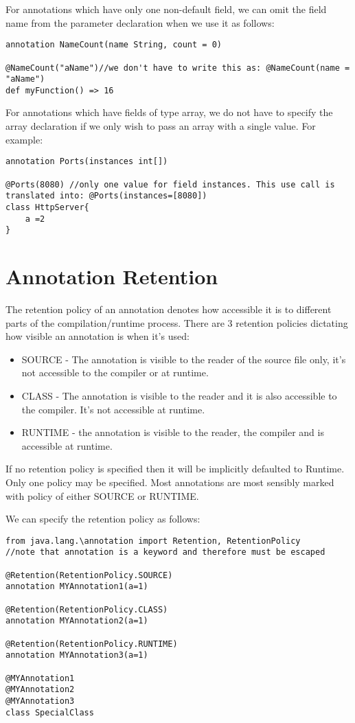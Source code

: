 \documentclass[conc-doc]{subfiles}
\begin{document}
For annotations which have only one non-default field, we can omit the field name from the parameter declaration when we use it as follows:
\begin{lstlisting}
annotation NameCount(name String, count = 0)

@NameCount("aName")//we don't have to write this as: @NameCount(name = "aName")
def myFunction() => 16
\end{lstlisting}

For annotations which have fields of type array, we do not have to specify the array declaration if we only wish to pass an array with a single value. For example:
\begin{lstlisting}
annotation Ports(instances int[])

@Ports(8080) //only one value for field instances. This use call is translated into: @Ports(instances=[8080])
class HttpServer{
	a =2
}
\end{lstlisting}

\section{Annotation Retention}
The retention policy of an annotation denotes how accessible it is to different parts of the compilation/runtime process. There are 3 retention policies dictating how visible an annotation is when it's used:
\begin{itemize}
	\item SOURCE - The annotation is visible to the reader of the source file only, it's not accessible to the compiler or at runtime.
	\item CLASS - The annotation is visible to the reader and it is also accessible to the compiler. It's not accessible at runtime.
	\item RUNTIME - the annotation is visible to the reader, the compiler and is accessible at runtime.
\end{itemize}

If no retention policy is specified then it will be implicitly defaulted to Runtime. Only one policy may be specified. Most annotations are most sensibly marked with policy of either SOURCE or RUNTIME.

We can specify the retention policy as follows:

\begin{lstlisting}
from java.lang.\annotation import Retention, RetentionPolicy
//note that annotation is a keyword and therefore must be escaped

@Retention(RetentionPolicy.SOURCE)
annotation MYAnnotation1(a=1)

@Retention(RetentionPolicy.CLASS)
annotation MYAnnotation2(a=1)

@Retention(RetentionPolicy.RUNTIME)
annotation MYAnnotation3(a=1)

@MYAnnotation1
@MYAnnotation2
@MYAnnotation3
class SpecialClass
\end{lstlisting}
\end{document}
